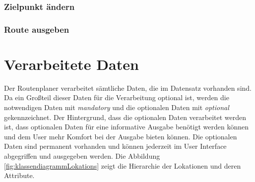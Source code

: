 \documentclass[12pt, a4paper, ngerman]{article}
\begin{document}
\subsubsection{Zielpunkt ändern \label{uc:ZielpunktAendern}}
\begin{usecase}
	\uprecondition{\ref{uc:RouteBerechnen}}
\end{usecase}

\subsubsection{Route ausgeben \label{uc:RouteAusgeben}}
\begin{usecase}
\end{usecase}

\section{Verarbeitete Daten \label{attributBeschreibungen}}
Der Routenplaner verarbeitet sämtliche Daten, die im Datensatz vorhanden sind. Da ein Großteil dieser Daten für die Verarbeitung optional ist, werden die notwendigen Daten mit \textit{mandatory} und die optionalen Daten mit \textit{optional} gekennzeichnet. Der Hintergrund, dass die optionalen Daten verarbeitet werden ist, dass optionalen Daten für eine informative Ausgabe benötigt werden können und dem User mehr Komfort bei der Ausgabe bieten können. Die optionalen Daten sind permanent vorhanden und können jederzeit im User Interface abgegriffen und ausgegeben werden.
Die Abbildung \ref{fig:klassendiagrammLokations} zeigt die Hierarchie der Lokationen und deren Attribute.
\end{document}
